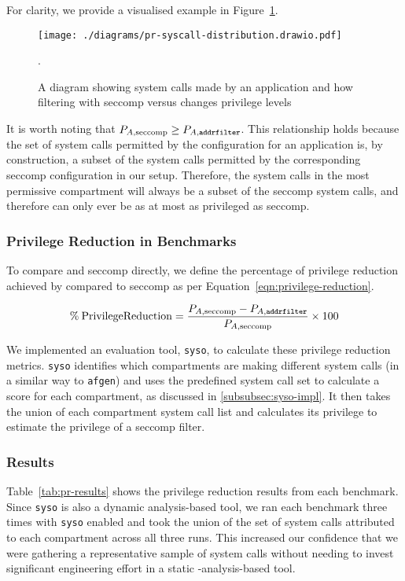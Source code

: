 For clarity, we provide a visualised example in
Figure~\ref{fig:pr}.

\begin{figure}[htbp]
    \centering
    \texttt{[image: ./diagrams/pr-syscall-distribution.drawio.pdf]}
    \caption{A diagram showing system calls made by an application and how
    filtering with seccomp versus \af changes privilege levels}.
    \label{fig:pr}
\end{figure}


It is worth noting that $P_{A, \text{seccomp}} \ge P_{A, \texttt{addrfilter}}$. This
relationship holds because the set of system calls permitted by the \af 
configuration for an application is, by construction, a subset of the system
calls permitted by the corresponding seccomp configuration in our setup.
Therefore, the system calls in the most permissive \af compartment will always
be a subset of the seccomp system calls, and therefore \af can only ever be as at
most as privileged as seccomp.

\subsubsection{Privilege Reduction in Benchmarks}

To compare \af and seccomp directly, we define the percentage of privilege
reduction achieved by \af compared to seccomp as per 
Equation~\ref{eqn:privilege-reduction}.  

\begin{equation}\label{eqn:privilege-reduction}
    \% \: \mathrm{Privilege Reduction} = 
    \frac{P_{A, \text{seccomp}} - P_{A, \text{\texttt{addrfilter}}}}{P_{A, \text{seccomp}}} 
            \times 100
\end{equation}

We implemented an evaluation tool, \texttt{syso}, to calculate these privilege
reduction metrics. \texttt{syso} identifies which compartments are making
different system calls (in a similar way to \texttt{afgen}) and uses the
predefined system call set to calculate a score for each compartment, as
discussed in \ref{subsubsec:syso-impl}. It then takes the union of each
compartment system call list and calculates its privilege to
estimate the privilege of a seccomp filter.

\subsubsection{Results}

Table~\ref{tab:pr-results} shows the privilege reduction results from each benchmark.
Since \texttt{syso} is also a dynamic analysis-based tool, we ran each
benchmark three times with \texttt{syso} enabled and took the union of the set of
system calls attributed to each compartment across all three runs. This
increased our confidence that we were gathering a representative sample of
system calls without needing to invest significant engineering effort in a static
-analysis-based tool. 

